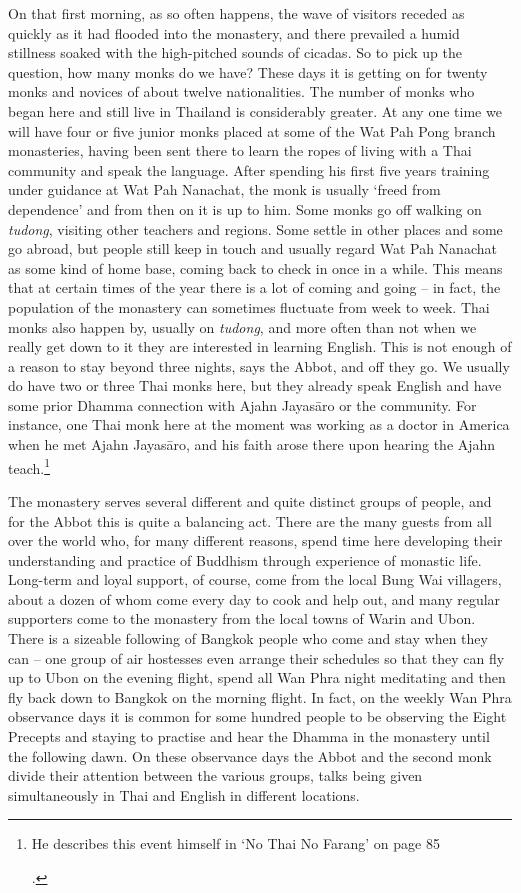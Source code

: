 On that first morning, as so often happens, the wave of visitors receded
as quickly as it had flooded into the monastery, and there prevailed a
humid stillness soaked with the high-pitched sounds of cicadas. So to
pick up the question, how many monks do we have? These days it is
getting on for twenty monks and novices of about twelve nationalities.
The number of monks who began here and still live in Thailand is
considerably greater. At any one time we will have four or five junior
monks placed at some of the Wat Pah Pong branch monasteries, having been
sent there to learn the ropes of living with a Thai community and speak
the language. After spending his first five years training under
guidance at Wat Pah Nanachat, the monk is usually `freed from
dependence' and from then on it is up to him. Some monks go off walking
on \emph{tudong}, visiting other teachers and regions. Some settle in
other places and some go abroad, but people still keep in touch and
usually regard Wat Pah Nanachat as some kind of home base, coming back
to check in once in a while. This means that at certain times of the
year there is a lot of coming and going -- in fact, the population of
the monastery can sometimes fluctuate from week to week. Thai monks also
happen by, usually on \emph{tudong}, and more often than not when we
really get down to it they are interested in learning English. This is
not enough of a reason to stay beyond three nights, says the Abbot, and
off they go. We usually do have two or three Thai monks here, but they
already speak English and have some prior Dhamma connection with Ajahn
Jayasāro or the community. For instance, one Thai monk here at the
moment was working as a doctor in America when he met Ajahn Jayasāro,
and his faith arose there upon hearing the Ajahn teach.\footnote{He
  describes this event himself in `No Thai No Farang' on page 85

  .}

The monastery serves several different and quite distinct groups of
people, and for the Abbot this is quite a balancing act. There are the
many guests from all over the world who, for many different reasons,
spend time here developing their understanding and practice of Buddhism
through experience of monastic life. Long-term and loyal support, of
course, come from the local Bung Wai villagers, about a dozen of whom
come every day to cook and help out, and many regular supporters come to
the monastery from the local towns of Warin and Ubon. There is a
sizeable following of Bangkok people who come and stay when they can --
one group of air hostesses even arrange their schedules so that they can
fly up to Ubon on the evening flight, spend all Wan Phra night
meditating and then fly back down to Bangkok on the morning flight. In
fact, on the weekly Wan Phra observance days it is common for some
hundred people to be observing the Eight Precepts and staying to
practise and hear the Dhamma in the monastery until the following dawn.
On these observance days the Abbot and the second monk divide their
attention between the various groups, talks being given simultaneously
in Thai and English in different locations.

